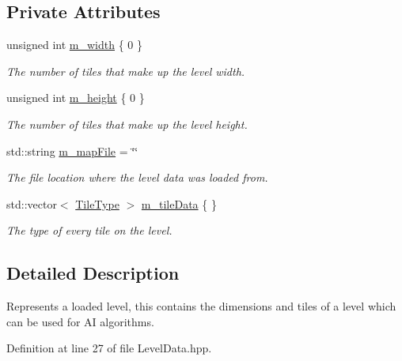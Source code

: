 \subsection*{Private Attributes}
\begin{DoxyCompactItemize}
\item 
unsigned int \hyperlink{classLevelData_af2aaac4914ff63edf43f93592e117abf}{m\+\_\+width} \{ 0 \}
\begin{DoxyCompactList}\small\item\em The number of tiles that make up the level width. \end{DoxyCompactList}\item 
unsigned int \hyperlink{classLevelData_af6895162dbf2aae99d81f2bd39bfd0fc}{m\+\_\+height} \{ 0 \}
\begin{DoxyCompactList}\small\item\em The number of tiles that make up the level height. \end{DoxyCompactList}\item 
std\+::string \hyperlink{classLevelData_a65e6372aea8e8d29fe9a554653a1ad24}{m\+\_\+map\+File} = \char`\"{}\char`\"{}
\begin{DoxyCompactList}\small\item\em The file location where the level data was loaded from. \end{DoxyCompactList}\item 
std\+::vector$<$ \hyperlink{LevelData_8hpp_a47dee72188473c57343127b1a5843398}{Tile\+Type} $>$ \hyperlink{classLevelData_a32b98877ba76059d320053f55dd97051}{m\+\_\+tile\+Data} \{ \}
\begin{DoxyCompactList}\small\item\em The type of every tile on the level. \end{DoxyCompactList}\end{DoxyCompactItemize}


\subsection{Detailed Description}
Represents a loaded level, this contains the dimensions and tiles of a level which can be used for A\+I algorithms. 



Definition at line 27 of file Level\+Data.\+hpp.



